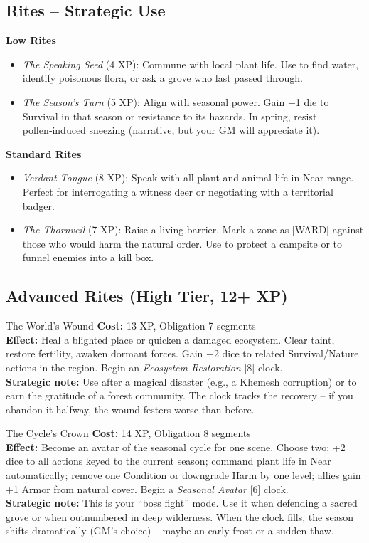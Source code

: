 \documentclass[10pt,a5paper]{book}
\begin{document}
\subsection*{Rites – Strategic Use}

\textbf{Low Rites}
\begin{itemize}
    \item \textit{The Speaking Seed} (4 XP): Commune with local plant life. Use to find water, identify poisonous flora, or ask a grove who last passed through.
    \item \textit{The Season’s Turn} (5 XP): Align with seasonal power. Gain +1 die to Survival in that season or resistance to its hazards. In spring, resist pollen‑induced sneezing (narrative, but your GM will appreciate it).
\end{itemize}

\textbf{Standard Rites}
\begin{itemize}
    \item \textit{Verdant Tongue} (8 XP): Speak with all plant and animal life in Near range. Perfect for interrogating a witness deer or negotiating with a territorial badger.
    \item \textit{The Thornveil} (7 XP): Raise a living barrier. Mark a zone as [WARD] against those who would harm the natural order. Use to protect a campsite or to funnel enemies into a kill box.
\end{itemize}

\subsection*{Advanced Rites (High Tier, 12+ XP)}

\begin{patronbox}{The World’s Wound}
\textbf{Cost:} 13 XP, Obligation 7 segments \\
\textbf{Effect:} Heal a blighted place or quicken a damaged ecosystem. Clear taint, restore fertility, awaken dormant forces. Gain +2 dice to related Survival/Nature actions in the region. Begin an \textit{Ecosystem Restoration} [8] clock. \\
\textbf{Strategic note:} Use after a magical disaster (e.g., a Khemesh corruption) or to earn the gratitude of a forest community. The clock tracks the recovery – if you abandon it halfway, the wound festers worse than before.
\end{patronbox}

\begin{patronbox}{The Cycle’s Crown}
\textbf{Cost:} 14 XP, Obligation 8 segments \\
\textbf{Effect:} Become an avatar of the seasonal cycle for one scene. Choose two: +2 dice to all actions keyed to the current season; command plant life in Near automatically; remove one Condition or downgrade Harm by one level; allies gain +1 Armor from natural cover. Begin a \textit{Seasonal Avatar} [6] clock. \\
\textbf{Strategic note:} This is your “boss fight” mode. Use it when defending a sacred grove or when outnumbered in deep wilderness. When the clock fills, the season shifts dramatically (GM’s choice) – maybe an early frost or a sudden thaw.
\end{patronbox}
\end{document}
